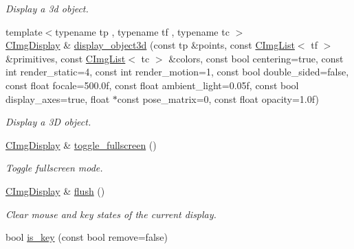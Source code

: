 \begin{DoxyCompactItemize}
\begin{DoxyCompactList}\small\item\em Display a 3d object. \end{DoxyCompactList}\item 
\hypertarget{structcimg__library_1_1_c_img_display_aa9f7481c33979dbbe699cf77fc908ffc}{{\footnotesize template$<$typename tp , typename tf , typename tc $>$ }\\\hyperlink{structcimg__library_1_1_c_img_display}{C\-Img\-Display} \& \hyperlink{structcimg__library_1_1_c_img_display_aa9f7481c33979dbbe699cf77fc908ffc}{display\-\_\-object3d} (const tp \&points, const \hyperlink{structcimg__library_1_1_c_img_list}{C\-Img\-List}$<$ tf $>$ \&primitives, const \hyperlink{structcimg__library_1_1_c_img_list}{C\-Img\-List}$<$ tc $>$ \&colors, const bool centering=true, const int render\-\_\-static=4, const int render\-\_\-motion=1, const bool double\-\_\-sided=false, const float focale=500.\-0f, const float ambient\-\_\-light=0.\-05f, const bool display\-\_\-axes=true, float $\ast$const pose\-\_\-matrix=0, const float opacity=1.\-0f)}\label{structcimg__library_1_1_c_img_display_aa9f7481c33979dbbe699cf77fc908ffc}

\begin{DoxyCompactList}\small\item\em Display a 3\-D object. \end{DoxyCompactList}\item 
\hypertarget{structcimg__library_1_1_c_img_display_a4e6138906a037d73e90b7525861f0058}{\hyperlink{structcimg__library_1_1_c_img_display}{C\-Img\-Display} \& \hyperlink{structcimg__library_1_1_c_img_display_a4e6138906a037d73e90b7525861f0058}{toggle\-\_\-fullscreen} ()}\label{structcimg__library_1_1_c_img_display_a4e6138906a037d73e90b7525861f0058}

\begin{DoxyCompactList}\small\item\em Toggle fullscreen mode. \end{DoxyCompactList}\item 
\hypertarget{structcimg__library_1_1_c_img_display_afd52d33aa818b64754a9ec1e5c8047a3}{\hyperlink{structcimg__library_1_1_c_img_display}{C\-Img\-Display} \& \hyperlink{structcimg__library_1_1_c_img_display_afd52d33aa818b64754a9ec1e5c8047a3}{flush} ()}\label{structcimg__library_1_1_c_img_display_afd52d33aa818b64754a9ec1e5c8047a3}

\begin{DoxyCompactList}\small\item\em Clear mouse and key states of the current display. \end{DoxyCompactList}\item 
\hypertarget{structcimg__library_1_1_c_img_display_a271d7ef4f15453cc0cabed68c3e42229}{bool \hyperlink{structcimg__library_1_1_c_img_display_a271d7ef4f15453cc0cabed68c3e42229}{is\-\_\-key} (const bool remove=false)}\label{structcimg__library_1_1_c_img_display_a271d7ef4f15453cc0cabed68c3e42229}


\end{DoxyCompactItemize}

